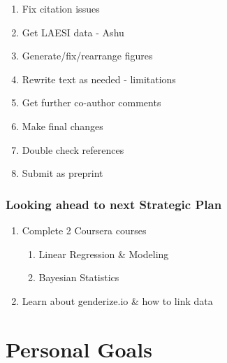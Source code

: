 \documentclass[]{article}
\providecommand{\tightlist}{%
  \setlength{\itemsep}{0pt}\setlength{\parskip}{0pt}}
\begin{document}
\begin{enumerate}
  \begin{enumerate}
  \def\labelenumii{\roman{enumii})}
  \tightlist
  \item
    Fix citation issues
  \item
    Get LAESI data - Ashu
  \item
    Generate/fix/rearrange figures
  \item
    Rewrite text as needed - limitations
  \item
    Get further co-author comments
  \item
    Make final changes
  \item
    Double check references
  \item
    Submit as preprint
  \end{enumerate}
\end{enumerate}

\subsubsection{Looking ahead to next Strategic
Plan}\label{looking-ahead-to-next-strategic-plan}

\begin{enumerate}
\def\labelenumi{\arabic{enumi}.}
\tightlist
\item
  Complete 2 Coursera courses

  \begin{enumerate}
  \def\labelenumii{\roman{enumii})}
  \tightlist
  \item
    Linear Regression \& Modeling
  \item
    Bayesian Statistics
  \end{enumerate}
\item
  Learn about genderize.io \& how to link data
\end{enumerate}

\section{Personal Goals}\label{personal-goals}
\end{document}

